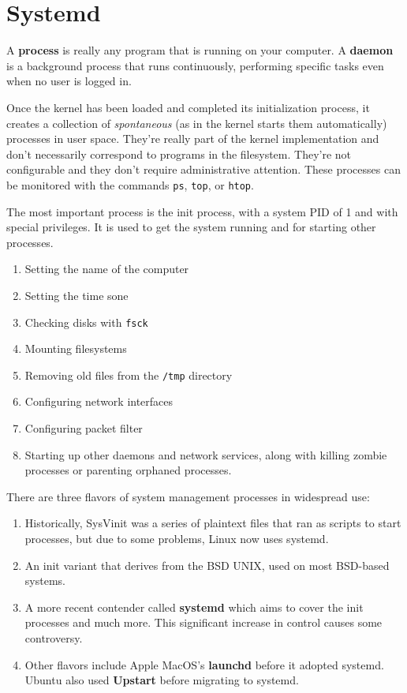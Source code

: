 \documentclass{article}
\begin{document}
\section{Systemd} 

  A \textbf{process} is really any program that is running on your computer. A \textbf{daemon} is a background process that runs continuously, performing specific tasks even when no user is logged in. 

  Once the kernel has been loaded and completed its initialization process, it creates a collection of \textit{spontaneous} (as in the kernel starts them automatically) processes in user space. They're really part of the kernel implementation and don't necessarily correspond to programs in the filesystem. They're not configurable and they don't require administrative attention. These processes can be monitored with the commands \texttt{ps}, \texttt{top}, or \texttt{htop}.

  The most important process is the init process, with a system PID of 1 and with special privileges. It is used to get the system running and for starting other processes. 

  \begin{enumerate}
    \item Setting the name of the computer 
    \item Setting the time sone 
    \item Checking disks with \texttt{fsck} 
    \item Mounting filesystems 
    \item Removing old files from the \texttt{/tmp} directory 
    \item Configuring network interfaces
    \item Configuring packet filter 
    \item Starting up other daemons and network services, along with killing zombie processes or parenting orphaned processes. 
  \end{enumerate}

  There are three flavors of system management processes in widespread use: 
  \begin{enumerate}
    \item Historically, SysVinit was a series of plaintext files that ran as scripts to start processes, but due to some problems, Linux now uses systemd.
    \item An init variant that derives from the BSD UNIX, used on most BSD-based systems. 
    \item A more recent contender called \textbf{systemd} which aims to cover the init processes and much more. This significant increase in control causes some controversy. 
    \item Other flavors include Apple MacOS's \textbf{launchd} before it adopted systemd. Ubuntu also used \textbf{Upstart} before migrating to systemd. 
  \end{enumerate}
\end{document}
